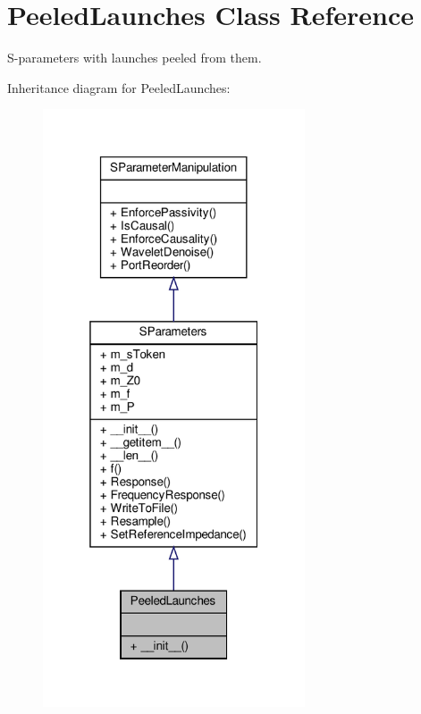 \hypertarget{classSignalIntegrity_1_1ImpedanceProfile_1_1PeeledLaunches_1_1PeeledLaunches}{}\section{Peeled\+Launches Class Reference}
\label{classSignalIntegrity_1_1ImpedanceProfile_1_1PeeledLaunches_1_1PeeledLaunches}


S-\/parameters with launches peeled from them.  




Inheritance diagram for Peeled\+Launches\+:
\nopagebreak
\begin{figure}[H]
\begin{center}
\leavevmode
\includegraphics[width=220pt]{classSignalIntegrity_1_1ImpedanceProfile_1_1PeeledLaunches_1_1PeeledLaunches__inherit__graph}
\end{center}
\end{figure}


